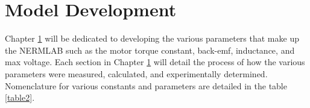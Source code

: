 
\cleardoublepage


\chapter{Model Development}
\label{chp3}

Chapter \ref{chp3} will be dedicated to developing the various parameters that make up the NERMLAB such as the motor torque constant, \ac{back-emf}, inductance, and max voltage. Each section in Chapter \ref{chp3} will detail the process of how the various parameters were measured, calculated, and experimentally determined. Nomenclature for various constants and parameters are detailed in the table \ref{table2}.

